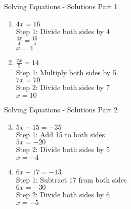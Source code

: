 \documentclass[aspectratio=169]{beamer}
\begin{document}
\begin{frame}{Solving Equations - Solutions Part 1}
    \begin{tcolorbox}[colback=lightgray,colframe=accent,title=Detailed Solutions]
        \begin{enumerate}
            \item $4x = 16$ \\
                Step 1: Divide both sides by 4 \\
                $\frac{4x}{4} = \frac{16}{4}$ \\
                $x = 4$
            
            \item $\frac{7x}{5} = 14$ \\
                Step 1: Multiply both sides by 5 \\
                $7x = 70$ \\
                Step 2: Divide both sides by 7 \\
                $x = 10$
        \end{enumerate}
    \end{tcolorbox}
\end{frame}

\begin{frame}{Solving Equations - Solutions Part 2}
    \begin{tcolorbox}[colback=lightgray,colframe=accent,title=Detailed Solutions]
        \begin{enumerate}
            \setcounter{enumi}{2}
            \item $5x - 15 = -35$ \\
                Step 1: Add 15 to both sides \\
                $5x = -20$ \\
                Step 2: Divide both sides by 5 \\
                $x = -4$
            
            \item $6x + 17 = -13$ \\
                Step 1: Subtract 17 from both sides \\
                $6x = -30$ \\
                Step 2: Divide both sides by 6 \\
                $x = -5$
        \end{enumerate}
    \end{tcolorbox}
\end{frame}
\end{document}
